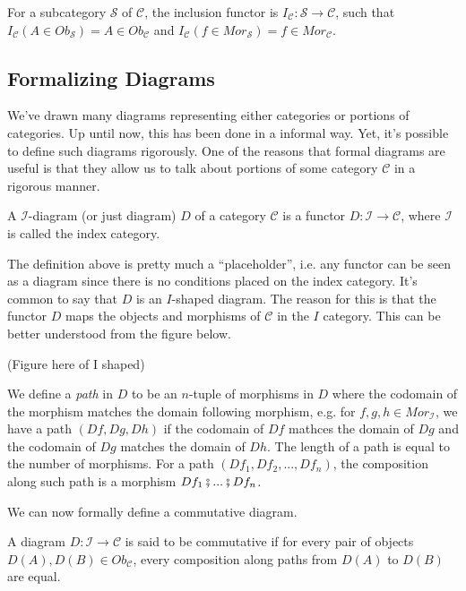 \begin{example}
  For a subcategory $\mathcal S$ of $\mathcal C$, the inclusion
  functor is $I_\mathcal C : \mathcal S \to \mathcal C$, such that
  $I_\mathcal C (A \in Ob_\mathcal S) = A \in Ob_\mathcal C$ and
  $I_\mathcal C (f \in Mor_\mathcal S) = f \in Mor_\mathcal C$.
\end{example}

\subsection{Formalizing Diagrams}

We've drawn many diagrams representing either categories or portions of categories. Up
until now, this has been done in a informal way. Yet, it's possible to define such diagrams rigorously.
One of the reasons that formal diagrams are useful is that they allow us to talk about portions
of some category $\mathcal C$ in a rigorous manner.

\begin{definition}[Diagram]
  A $\mathcal I$-diagram (or just diagram) $D$ of a category $\mathcal C$ is a functor
  $D: \mathcal I \to \mathcal C$, where $\mathcal I$ is called the index category.
\end{definition}

The definition above is pretty much a ``placeholder'', i.e. any functor can be seen as
a diagram since there is no conditions placed on the index category. It's common to
say that $D$ is an $I$-shaped diagram. The reason for this is that the functor
$D$ maps the objects and morphisms of $\mathcal C$ in the $I$ category. This
can be better understood from the figure below.

(Figure here of I shaped)

We define a \textit{path} in $D$ to be an $n$-tuple of morphisms in $D$ where
the codomain of the morphism matches the domain following morphism, e.g.
for $f,g,h \in Mor_\mathcal I$, we have a path $(Df, Dg, Dh)$ if
the codomain of $Df$ mathces the domain of $Dg$ and the codomain of $Dg$ matches
the domain of $Dh$.
The length of a path is equal to the number of morphisms. For a path
$(Df_1, Df_2,...,Df_n)$, the composition along such path is a morphism $Df_1\fatsemi ...\fatsemi Df_n$.

We can now formally define a commutative diagram.

\begin{definition}
  A diagram $D:\mathcal I \to \mathcal C$ is said to be commutative if 
  for every pair of objects $D(A), D(B) \in Ob_\mathcal C$,
  every composition along paths from $D(A)$ to $D(B)$ are equal.
\end{definition}

